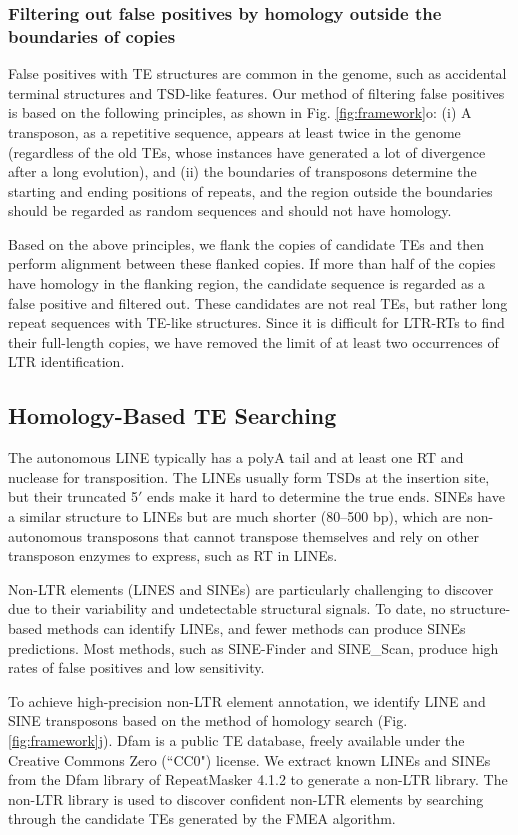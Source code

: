 \documentclass{bmcart}
\begin{document}
\subsubsection*{Filtering out false positives by homology outside the boundaries of copies}
False positives with TE structures are common in the genome, such as accidental terminal structures and TSD-like features. Our method of filtering false positives is based on the following principles, as shown in Fig. \ref{fig:framework}o: (i) A transposon, as a repetitive sequence, appears at least twice in the genome (regardless of the old TEs, whose instances have generated a lot of divergence after a long evolution), and (ii) the boundaries of transposons determine the starting and ending positions of repeats, and the region outside the boundaries should be regarded as random sequences and should not have homology.

Based on the above principles, we flank the copies of candidate TEs and then perform alignment between these flanked copies. If more than half of the copies have homology in the flanking region, the candidate sequence is regarded as a false positive and filtered out. These candidates are not real TEs, but rather long repeat sequences with TE-like structures. Since it is difficult for LTR-RTs to find their full-length copies, we have removed the limit of at least two occurrences of LTR identification.

\subsection*{Homology-Based TE Searching}
The autonomous LINE typically has a polyA tail and at least one RT and nuclease for transposition. The LINEs usually form TSDs at the insertion site, but their truncated 5$'$ ends make it hard to determine the true ends. SINEs have a similar structure to LINEs but are much shorter (80–500 bp), which are non-autonomous transposons that cannot transpose themselves and rely on other transposon enzymes to express, such as RT in LINEs.

Non-LTR elements (LINES and SINEs) are particularly challenging to discover due to their variability and undetectable structural signals. To date, no structure-based methods can identify LINEs, and fewer methods can produce SINEs predictions. Most methods, such as SINE-Finder\cite{wenke2011targeted} and SINE\_Scan\cite{mao2017sine_scan}, produce high rates of false positives and low sensitivity. 

To achieve high-precision non-LTR element annotation, we identify LINE and SINE transposons based on the method of homology search (Fig. \ref{fig:framework}j). Dfam is a public TE database, freely available under the Creative Commons Zero (``CC0") license. We extract known LINEs and SINEs from the Dfam library of RepeatMasker 4.1.2 to generate a non-LTR library. The non-LTR library is used to discover confident non-LTR elements by searching through the candidate TEs generated by the FMEA algorithm.
\end{document}
